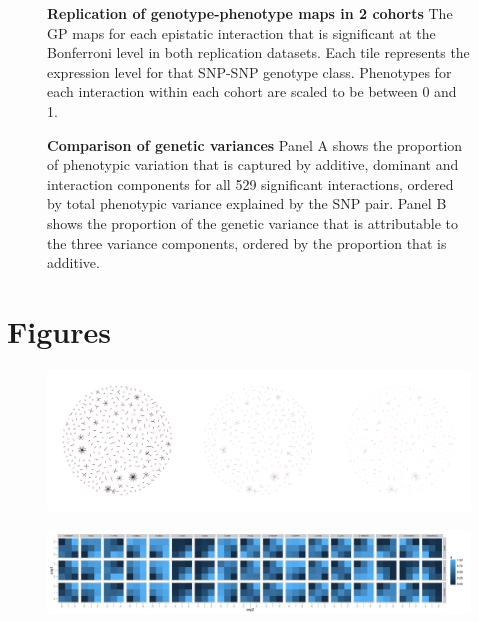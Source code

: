\documentclass{article}
\begin{document}
\begin{figure}[H]
	\caption{\textbf{Replication of genotype-phenotype maps in 2 cohorts} The GP maps for each epistatic interaction that is significant at the Bonferroni level in both replication datasets. Each tile represents the expression level for that SNP-SNP genotype class. Phenotypes for each interaction within each cohort are scaled to be between 0 and 1.}
	\label{fig:gpmaps}
\end{figure}

\begin{figure}[H]
	\caption{\textbf{Comparison of genetic variances} Panel A shows the proportion of phenotypic variation that is captured by additive, dominant and interaction components for all 529 significant interactions, ordered by total phenotypic variance explained by the SNP pair. Panel B shows the proportion of the genetic variance that is attributable to the three variance components, ordered by the proportion that is additive.}
	\label{fig:variancecomponents}
\end{figure}



\clearpage
\section{Figures}
\setcounter{figure}{0}

\begin{figure}[H]
\centering
\includegraphics[width=5in]{hairballs_all_reps.pdf}
\caption{}
\end{figure}
\clearpage

\begin{figure}
\centering
\includegraphics[width=5in]{gpbonfrep.pdf}
\caption{}
\end{figure}
\clearpage
\end{document}
